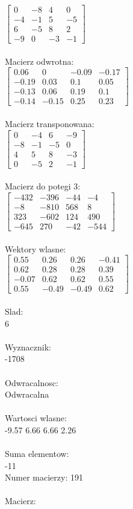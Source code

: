 \documentclass[a4paper,12pt]{article}
\begin{document}
$\begin{bmatrix} 0&-8&4&0\\-4&-1&5&-5\\6&-5&8&2\\-9&0&-3&-1 \end{bmatrix}$
\\
\\
Macierz odwrotna:\\

$\begin{bmatrix} 0.06&0&-0.09&-0.17\\-0.19&0.03&0.1&0.05\\-0.13&0.06&0.19&0.1\\-0.14&-0.15&0.25&0.23 \end{bmatrix}$
\\
\\
Macierz transponowana:\\

$\begin{bmatrix} 0&-4&6&-9\\-8&-1&-5&0\\4&5&8&-3\\0&-5&2&-1 \end{bmatrix}$
\\
\\
Macierz do potegi 3:\\

$\begin{bmatrix} -432&-396&-44&-4\\-8&-810&568&8\\323&-602&124&490\\-645&270&-42&-544 \end{bmatrix}$
\\
\\
Wektory wlasne:\\

$\begin{bmatrix} 0.55&0.26&0.26&-0.41\\0.62&0.28&0.28&0.39\\-0.07&0.62&0.62&0.55\\0.55&-0.49&-0.49&0.62 \end{bmatrix}$
\\
\\
Slad:\\
6
\\
\\
Wyznacznik:\\
-1708
\\
\\
Odwracalnosc:\\
Odwracalna
\\
\\
Wartosci wlasne:\\
-9.57 6.66 6.66 2.26
\\
\\
Suma elementow:\\
-11
\\
\newpage
Numer macierzy:
191
\\
\\
Macierz:\\
\end{document}
